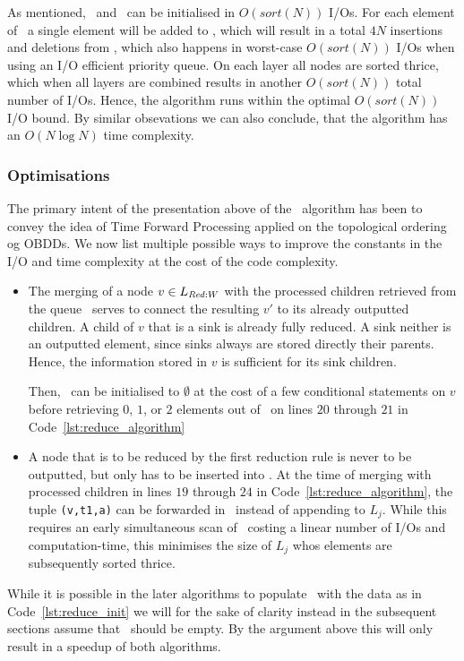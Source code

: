 As mentioned, \ReduceLwork\ and \ReduceLdep\ can be initialised in $O(sort(N))$
I/Os. For each element of \ReduceLdep\ a single element will be added to
\ReduceQdep, which will result in a total $4 N$ insertions and deletions from
\ReduceQdep, which also happens in worst-case $O(sort(N))$ I/Os when using an
I/O efficient priority queue. On each layer all nodes are sorted thrice, which
when all layers are combined results in another $O(sort(N))$ total number of
I/Os. Hence, the algorithm runs within the optimal $O(sort(N))$ I/O bound.
\cite{Arge96} By similar obsevations we can also conclude, that the algorithm
has an $O(N \log N)$ time complexity.

\subsubsection{Optimisations} \label{sec:reduce_optimisations}
The primary intent of the presentation above of the \Reduce\ algorithm has been
to convey the idea of Time Forward Processing applied on the topological
ordering og OBDDs. We now list multiple possible ways to improve the constants
in the I/O and time complexity at the cost of the code complexity.

\begin{itemize}
\item The merging of a node $v \in L_{\mathit{Red:}W}$ with the processed children
  retrieved from the queue \ReduceQdep\ serves to connect the resulting $v'$ to
  its already outputted children. A child of $v$ that is a sink is already fully
  reduced. A sink neither is an outputted element, since sinks always are stored
  directly their parents. Hence, the information stored in $v$ is sufficient
  for its sink children.

  Then, \ReduceQdep\ can be initialised to $\emptyset$ at the cost of a few
  conditional statements on $v$ before retrieving $0$, $1$, or $2$ elements out
  of \ReduceQdep\ on lines $20$ through $21$ in Code~\ref{lst:reduce_algorithm}

\item A node that is to be reduced by the first reduction rule is never to be
  outputted, but only has to be inserted into \ReduceQdep. At the time of
  merging with processed children in lines $19$ through $24$ in
  Code~\ref{lst:reduce_algorithm}, the tuple \lstinline{(v,t1,a)} can be
  forwarded in \ReduceQdep\ instead of appending to $L_j$. While this requires
  an early simultaneous scan of \ReduceLdep\ costing a linear number of I/Os
  and computation-time, this minimises the size of $L_j$ whos elements are
  subsequently sorted thrice.
\end{itemize}
While it is possible in the later algorithms to populate \ReduceQdep\ with the
data as in Code~\ref{lst:reduce_init} we will for the sake of clarity instead in
the subsequent sections assume that \ReduceQdep\ should be empty. By the
argument above this will only result in a speedup of both algorithms.

